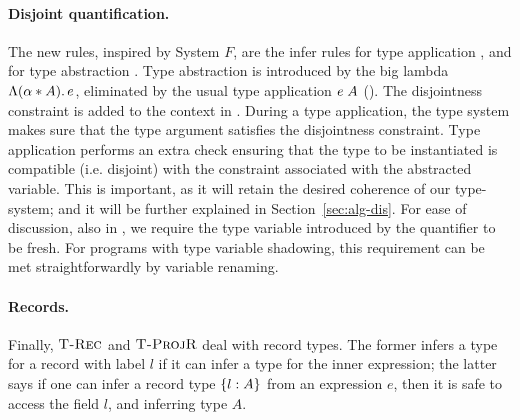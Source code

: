 \paragraph{Disjoint quantification.}
The new rules, inspired by System $F$, are the infer rules for type
application , and for type abstraction
.  Type abstraction is introduced by the big
lambda $\Lambda (\alpha* A).\, e$, eliminated by the usual type application
$e \; A$ ().  The disjointness constraint is
added to the context in . During a type application, the
type system makes sure that the type argument satisfies the
disjointness constraint.  Type application performs an extra check
ensuring that the type to be instantiated is compatible
(i.e. disjoint) with the constraint associated with the abstracted
variable.  This is important, as it will retain the desired coherence
of our type-system; and it will be further explained in Section~\ref{sec:alg-dis}.  
For ease of discussion, also in
, we require the type variable introduced by the
quantifier to be fresh.  For programs with type variable shadowing,
this requirement can be met straightforwardly by variable renaming.

\paragraph{Records.}
Finally, $\textsc{T-Rec}$ and $\textsc{T-ProjR}$ deal with record types.
The former infers a type for a record with label $l$ if it can infer a type for the
inner expression; the latter says if one can infer a record type $\{ l : A \}$ 
from an expression $e$, then it is safe to access the field $l$, and inferring type $A$.


